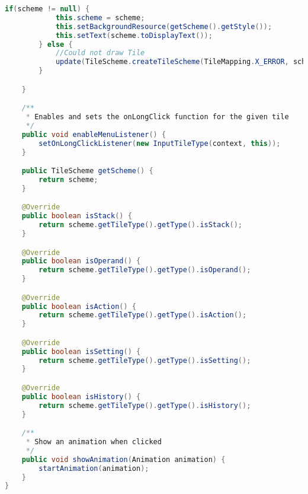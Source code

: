 \begin{lstlisting}[caption=Tile,label=list:Tile,language=Java]
        if(scheme != null) {
            this.scheme = scheme;
            this.setBackgroundResource(getScheme().getStyle());
            this.setText(scheme.toDisplayText());
        } else {
            //Could not draw Tile
            update(TileScheme.createTileScheme(TileMapping.X_ERROR, scheme.getContent()));
        }

    }

    /**
     * Enables and sets the onLongClick function for the given tile
     */
    public void enableMenuListener() {
        setOnLongClickListener(new InputTileType(context, this));
    }

    public TileScheme getScheme() {
        return scheme;
    }

    @Override
    public boolean isStack() {
        return scheme.getTileType().getType().isStack();
    }

    @Override
    public boolean isOperand() {
        return scheme.getTileType().getType().isOperand();
    }

    @Override
    public boolean isAction() {
        return scheme.getTileType().getType().isAction();
    }

    @Override
    public boolean isSetting() {
        return scheme.getTileType().getType().isSetting();
    }

    @Override
    public boolean isHistory() {
        return scheme.getTileType().getType().isHistory();
    }

    /**
     * Show an animation when clicked
     */
    public void showAnimation(Animation animation) {
        startAnimation(animation);
    }
}
\end{lstlisting}    

